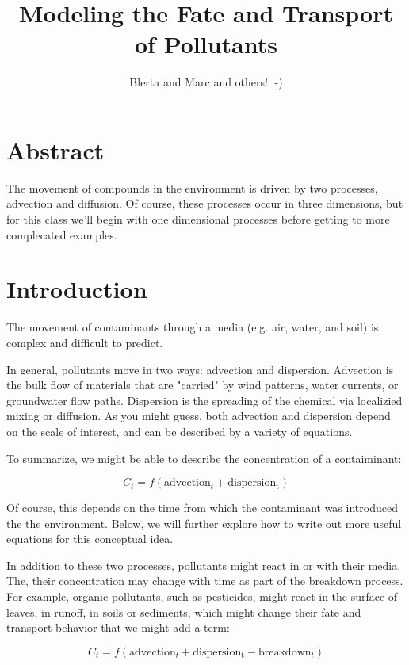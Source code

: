 \documentclass{article}
\author{Blerta and Marc and others! :-)}
\title{Modeling the Fate and Transport of Pollutants}
\begin{document}

\maketitle

\section{Abstract}
\noindent The movement of compounds in the environment is driven by two processes, advection and diffusion. Of course, these processes occur in three dimensions, but for this class we'll begin with one dimensional processes before getting to more complecated examples.

\section{Introduction}

The movement of contaminants through a media (e.g. air, water, and soil) is complex and difficult to predict. 

In general, pollutants move in two ways: advection and dispersion. Advection is the bulk flow of materials that are "carried" by wind patterns, water currents, or groundwater flow paths. Dispersion is the spreading of the chemical via localizied mixing or diffusion. As you might guess, both advection and dispersion depend on the scale of interest, and can be described by a variety of equations.

To summarize, we might be able to describe the concentration of a contaiminant:

\begin{equation}
C_t = f(\mathrm{advection}_t + \mathrm{dispersion_t})
\end{equation}

Of course, this depends on the time from which the contaminant was introduced the the environment. Below, we will further explore how to write out more useful equations for this conceptual idea.

In addition to these two processes, pollutants might react in or with their media. The, their concentration may change with time as part of the breakdown process. For example, organic pollutants, such as pesticides, might react in the surface of leaves, in runoff, in soils or sediments, which might change their fate and transport behavior that we might add a term: 

\begin{equation}
C_t = f(\mathrm{advection}_t + \mathrm{dispersion_t} - \mathrm{breakdown}_t)
\end{equation}
\end{document}
